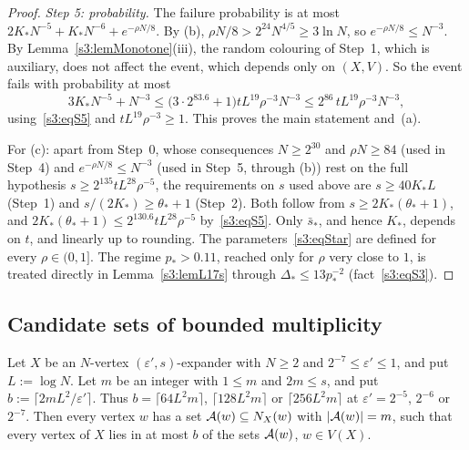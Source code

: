 \begin{proof}
\smallskip\noindent\emph{Step 5: probability.} The failure probability
is at most $2K_*N^{-5}+K_*N^{-6}+e^{-\rho N/8}$. By (b),
$\rho N/8>2^{24}N^{4/5}\ge3\ln N$, so $e^{-\rho N/8}\le N^{-3}$. By
Lemma~\ref{s3:lemMonotone}(iii), the random colouring of Step~1, which is
auxiliary, does not affect the event, which depends only on $(X,V)$. So
the event fails with probability at most
\[
3K_*N^{-5}+N^{-3}\le\big(3\cdot2^{83.6}+1\big)tL^{19}\rho^{-3}N^{-3}\le2^{86}\,tL^{19}\rho^{-3}N^{-3},
\]
using~\ref{s3:eqS5} and $tL^{19}\rho^{-3}\ge1$. This proves the main
statement and~(a).

For (c): apart from Step~0, whose consequences $N\ge2^{30}$ and $\rho N\ge84$
(used in Step~4) and $e^{-\rho N/8}\le N^{-3}$ (used in Step~5, through (b)) rest
on the full hypothesis $s\ge2^{135}tL^{28}\rho^{-5}$, the requirements on $s$
used above are $s\ge40K_*L$ (Step~1) and $s/(2K_*)\ge\theta_*+1$ (Step~2). Both follow from
$s\ge2K_*(\theta_*+1)$, and $2K_*(\theta_*+1)\le2^{130.6}tL^{28}\rho^{-5}$
by~\ref{s3:eqS5}. Only $\bar s_*$, and hence $K_*$, depends on $t$, and
linearly up to rounding. The parameters~\eqref{s3:eqStar} are defined for
every $\rho\in(0,1]$. The regime $p_*>0.11$, reached only for $\rho$ very
close to $1$, is treated directly in Lemma~\ref{s3:lemL17s} through
$\Delta_*\le13p_*^{-2}$ (fact~\ref{s3:eqS3}).
\end{proof}

\subsection{Candidate sets of bounded multiplicity}

\begin{lemma}\label{s3:lemHB}
Let $X$ be an $N$-vertex $(\varepsilon',s)$-expander with $N\ge2$ and
$2^{-7}\le\varepsilon'\le1$, and put $L:=\log N$. Let $m$ be an integer
with $1\le m$ and $2m\le s$, and put $b:=\lceil2mL^2/\varepsilon'\rceil$.
Thus $b=\lceil64L^2m\rceil$, $\lceil128L^2m\rceil$ or
$\lceil256L^2m\rceil$ at $\varepsilon'=2^{-5}$, $2^{-6}$ or $2^{-7}$.
Then every vertex $w$ has a set $\mathcal{A}(w)\subseteq N_X(w)$ with
$|\mathcal{A}(w)|=m$, such that every vertex of $X$ lies in at most $b$ of the
sets $\mathcal{A}(w)$, $w\in V(X)$.
\deps{\ref{s1:citHall}, \ref{s1:citDef11}}
\end{lemma}

